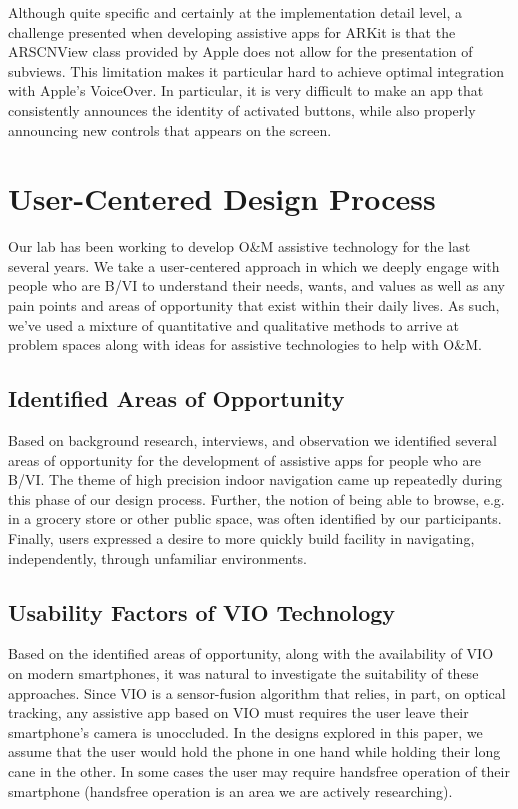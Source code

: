 \documentclass[chi_draft]{sigchi}
\newcommand{\BVI}{B/VI\xspace}
\newcommand{\OM}{O\&M\xspace}
\begin{document}
Although quite specific and certainly at the implementation detail level, a challenge presented when developing assistive apps for ARKit is that the ARSCNView class provided by Apple does not allow for the presentation of subviews.  This limitation makes it particular hard to achieve optimal integration with Apple's VoiceOver.  In particular, it is very difficult to make an app that consistently announces the identity of activated buttons, while also properly announcing new controls that appears on the screen.

\section{User-Centered Design Process}
Our lab has been working to develop \OM assistive technology for the last several years.  We take a user-centered approach in which we deeply engage with people who are \BVI to understand their needs, wants, and values as well as any pain points and areas of opportunity that exist within their daily lives.  As such, we've used a mixture of quantitative and qualitative methods to arrive at problem spaces along with ideas for assistive technologies to help with \OM.

\subsection{Identified Areas of Opportunity}
Based on background research, interviews, and observation we identified several areas of opportunity for the development of assistive apps for people who are \BVI.  The theme of high precision  indoor navigation came up repeatedly during this phase of our design process.  Further, the notion of being able to browse, e.g. in a grocery store or other public space, was often identified by our participants.  Finally, users expressed a desire to more quickly build facility in navigating, independently, through unfamiliar environments.

\subsection{Usability Factors of VIO Technology}
Based on the identified areas of opportunity, along with the availability of VIO on modern smartphones, it was natural to investigate the suitability of these approaches.  Since VIO is a sensor-fusion algorithm that relies, in part, on optical tracking, any assistive app based on VIO must requires the user leave their smartphone's camera is unoccluded.  In the designs explored in this paper, we assume that the user would hold the phone in one hand while holding their long cane in the other.  In some cases the user may require handsfree operation of their smartphone (handsfree operation is an area we are actively researching).
\end{document}
